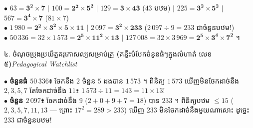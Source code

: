 \documentclass[a4paper,10pt]{article}
\newcommand{\en}[1]{{\TimesEn #1}}
\newcommand{\enbf}[1]{{\TimesEn\bfseries #1}}
\newcommand{\secstrip}[2]{%
  \vspace{3pt}%
  \begin{tcolorbox}[
    enhanced, sharp corners, colback=panelgray, colframe=black,
    boxrule=0.8pt, boxsep=0.8pt, top=2pt, bottom=2pt, left=5pt, right=5pt,
    after skip=3pt
  ]
    {\muol\fontsize{8.5pt}{12.2pt}\selectfont #1}\hfill{\fontsize{7.8pt}{10.8pt}\selectfont\textit{#2}}
  \end{tcolorbox}%
}
\begin{document}
\begin{tcolorbox}[
  enhanced, sharp corners, colback=white, colframe=black,
  boxrule=0.8pt, boxsep=2.5pt, top=4pt, bottom=4pt, left=6pt, right=6pt
]
  \fontsize{8.6pt}{12.7pt}\selectfont
  $\bullet$ $63 = \mathbf{3^2 \times 7}$ \quad $\mid$ \quad $100 = \mathbf{2^2 \times 5^2}$ \quad $\mid$ \quad $129 = \mathbf{3 \times 43}$ ($43$ បឋម) \quad $\mid$ \quad $225 = \mathbf{3^2 \times 5^2}$ \quad $\mid$ \quad $567 = \mathbf{3^4 \times 7}$ ($81\times 7$)\\[2.5pt]
  $\bullet$ $1\,980 = \mathbf{2^2 \times 3^2 \times 5 \times 11}$ \quad $\mid$ \quad $2\,097 = \mathbf{3^2 \times 233}$ ($2\,097\div 9 = 233$ ជាចំនួនបឋម!)\\[2.5pt]
  $\bullet$ $50\,336 = 32 \times 1\,573 = \mathbf{2^5 \times 11^2 \times 13}$ \quad $\mid$ \quad $127\,008 = 32 \times 3\,969 = \mathbf{2^5 \times 3^4 \times 7^2}$ ។
\end{tcolorbox}

\vfill
\secstrip{៤. ចំណុចប្រុងប្រយ័ត្នគរុកោសល្យសម្រាប់គ្រូ \enbf{(}គន្លឹះបំបែកចំនួនធំៗក្នុងលំហាត់ លេខ ៥\enbf{)}}{\en{Pedagogical Watchlist}}

\begin{tcolorbox}[
  enhanced, sharp corners, colback=panelgray, colframe=black,
  boxrule=0.85pt, boxsep=2.5pt, top=4pt, bottom=4pt, left=6pt, right=6pt
]
  \fontsize{8.6pt}{12.6pt}\selectfont
  $\bullet$ \textbf{ចំនួនធំ $50\,336$៖} ចែកនឹង $2$ ចំនួន $5$ ដងបាន $1\,573$ ។ ពិនិត្យ $1\,573$ ឃើញមិនចែកដាច់នឹង $2, 3, 5, 7$ តែចែកដាច់នឹង $11$៖ $1\,573\div 11 = 143 = 11\times 13$!\\[2pt]
  $\bullet$ \textbf{ចំនួន $2\,097$៖} ចែកដាច់នឹង $9$ ($2+0+9+7=18$) បាន $233$ ។ ពិនិត្យបឋម $\le 15$ ($2, 3, 5, 7, 11, 13$ — ព្រោះ $17^2=289>233$) ឃើញ $233$ មិនចែកដាច់នឹងមួយណាសោះ ដូច្នេះ $233$ ជាចំនួនបឋម!
\end{tcolorbox}
\end{document}
